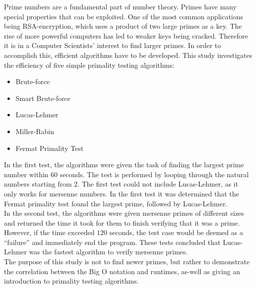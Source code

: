 \documentclass[main.tex]{subfiles}
\begin{document}
Prime numbers are a fundamental part of number theory. Primes have many special
properties that can be exploited. One of the most common applications being
RSA-encryption, which uses a product of two large primes as a key. The rise of
more powerful computers has led to weaker keys being cracked. Therefore it is in
a Computer Scientists' interest to find larger primes. In order to accomplish
this, efficient algorithms have to be developed. This study investigates the
efficiency of five simple primality testing algorithms:
\begin{multicols}{3}
  \begin{itemize}
  \item Brute-force
  \item Smart Brute-force
  \item Lucas-Lehmer
  \item Miller-Rabin
  \item Fermat Primality Test
  \end{itemize}
\end{multicols}

In the first test, the algorithms were given the task of finding the largest
prime number within $60$ seconds. The test is performed by looping through the
natural numbers starting from $2$. The first test could not include
Lucas-Lehmer, as it only works for mersenne numbers. In the first test it was
determined that the Fermat primality test found the largest prime, followed by Lucas-Lehmer. \\

In the second test, the algorithms were given mersenne primes of different sizes
and returned the time it took for them to finish verifying that it was a prime.
However, if the time exceeded $120$ seconds, the test case would be deemed as a
``failure'' and immediately end the program. These tests concluded that
Lucas-Lehmer was the fastest algorithm to verify mersenne primes. \\

The purpose of this study is not to find newer primes, but rather to demonstrate
the correlation between the Big O notation and runtimes, as-well as giving an
introduction to primality testing algorithms. \\
\end{document}
